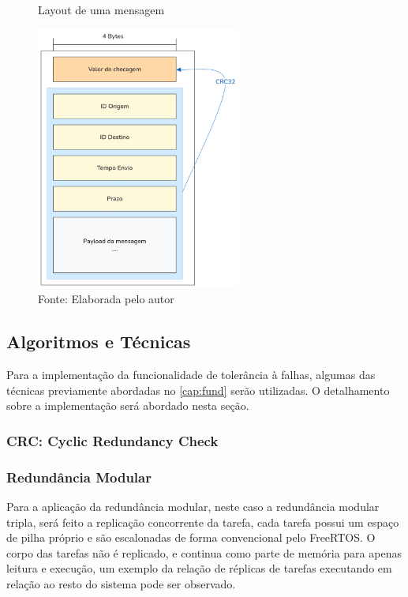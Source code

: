 \begin{figure}[H]
    \centering
    \caption{Layout de uma mensagem}
    \includegraphics[width=0.60\textwidth]{assets/payload_layout.png}
    \caption*{Fonte: Elaborada pelo autor}
    \label{fig:messageStruct}
\end{figure}

\subsection{Algoritmos e Técnicas}

Para a implementação da funcionalidade de tolerância à falhas, algumas das técnicas previamente abordadas no \autoref{cap:fund} serão utilizadas. O detalhamento sobre a implementação será abordado nesta seção.

\subsubsection{CRC: Cyclic Redundancy Check}

\subsubsection{Redundância Modular}

Para a aplicação da redundância modular, neste caso a redundância modular tripla, será feito a replicação concorrente da tarefa, cada tarefa possui um espaço de pilha próprio e são escalonadas de forma convencional pelo FreeRTOS. O corpo das tarefas não é replicado, e continua como parte de memória para apenas leitura e execução, um exemplo da relação de réplicas de tarefas executando em relação ao resto do sistema pode ser observado. 

